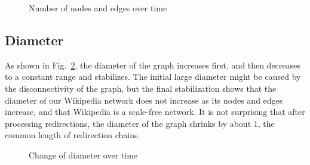 \documentclass[10pt,twocolumn]{article}
\begin{document}
\begin{figure}
\caption{Number of nodes and edges over time \label{fig:growth}}
\end{figure}

\subsection{Diameter}
As shown in Fig.~\ref{fig:diameter}, the diameter of the graph increases first, and then decreases to a constant range and stabilizes. The initial large diameter might be caused by the disconnectivity of the graph, but the final stabilization shows that the diameter of our Wikipedia network does not increase as its nodes and edges increase, and that Wikipedia is a scale-free network. It is not surprising that after processing redirections, the diameter of the graph shrinks by about 1, the common length of redirection chains.

\begin{figure}[ht]
\caption{Change of diameter over time\label{fig:diameter}}
\end{figure}
\end{document}
